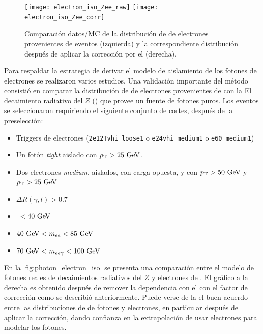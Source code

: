 \begin{figure}[!htbp]
  \centering

  \texttt{[image: electron\_iso\_Zee\_raw]}
  \texttt{[image: electron\_iso\_Zee\_corr]}

  \caption{Comparación datos/MC de la distribución de {\etiso} de electrones
    provenientes de eventos {\Zee} (izquierda) y la correspondiente distribución
    después de aplicar la corrección por el {\pt} (derecha).}
  \label{fig:isolation_wandwo_correction}
\end{figure}

Para respaldar la estrategia de derivar el modelo de aislamiento de los fotones
de electrones se realizaron varios estudios. Una validación importante del método
consistió en comparar la distribución de {\etiso} de electrones provenientes de
{\Zee} con la El decaimiento radiativo del $Z$ (\Zee\gam) que provee un fuente
de fotones puros. Los eventos se seleccionaron requiriendo el siguiente conjunto
de cortes, después de la preselección:

\begin{itemize}\itemsep0.1cm
\item Triggers de electrones (\texttt{2e12Tvhi\_loose1} o \texttt{e24vhi\_medium1} o \texttt{e60\_medium1})
\item Un fotón \emph{tight} aislado con $\pt>25 \gev$.
\item Dos electrones \emph{medium}, aislados, con carga opuesta, y con $\pt>50 \gev$ y $\pt>25 \gev$
\item $\Delta R(\gamma,l)>0.7$
\item \MET\ $<40\gev$
\item $40\gev<m_{ee}<85\gev$
\item $70\gev<m_{ee\gamma}<100\gev$
\end{itemize}

En la \cref{fig:photon_electron_iso} se presenta una comparación entre el modelo
de fotones reales de decaimientos radiativos del $Z$ y electrones de {\Zee}. El
gráfico a la derecha es obtenido después de remover la dependencia con el {\pt}
con el factor de corrección como se describió anteriormente. Puede verse de la
el buen acuerdo entre las distribuciones de {\etiso} de fotones y
electrones, en particular después de aplicar la corrección, dando confianza en la
extrapolación de usar electrones para modelar los fotones.


